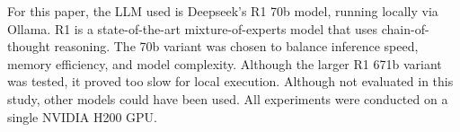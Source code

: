 \documentclass[phd,electronic,oneside,twosidetoc,letterpaper,chaptercenter,parttop,lof]{byumsphd}
\begin{document}
For this paper, the LLM used is Deepseek's R1 70b model, running locally via Ollama. R1 is a state-of-the-art mixture-of-experts model that uses chain-of-thought reasoning. The 70b variant was chosen to balance inference speed, memory efficiency, and model complexity. Although the larger R1 671b variant was tested, it proved too slow for local execution. Although not evaluated in this study, other models could have been used. All experiments were conducted on a single NVIDIA H200 GPU.

\end{document}
